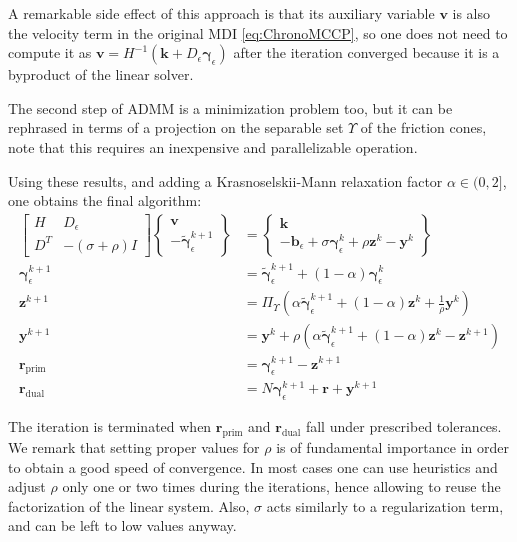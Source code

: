 \documentclass{svproc}
\newcommand{\vect}[1]{\bm{#1}}
\begin{document}
A remarkable side effect of this approach is that its auxiliary variable $\vect{v}$ is also the velocity term in the original MDI 
\eqref{eq:ChronoMCCP}, so one does not need to compute it as $\vect{v}=H^{-1}(\vect{k} + D_\epsilon \vect{\gamma}_\epsilon )$ after the iteration converged because it is a byproduct of the linear solver.

The second step of ADMM is a minimization problem too, but it can be rephrased in terms of a projection on the separable set $\Upsilon$ of the friction cones, note that this requires an inexpensive and parallelizable operation. 

Using these results, and adding a Krasnoselskii-Mann relaxation factor $\alpha \in(0,2]$, one obtains the final algorithm:
%
\begin{subequations}
	\begin{align}
    \begin{bmatrix}
		 H   & D_\epsilon \\
		 D^T & -(\sigma+\rho) I
		\end{bmatrix}
		\begin{Bmatrix}
		 \vect{v}    \\
		 -\tilde{\vect{\gamma}}_\epsilon^{k+1}
		\end{Bmatrix}
		&=
		\begin{Bmatrix}
		 \vect{k} \\
		 -\vect{b}_\epsilon + \sigma \vect{\gamma}_\epsilon^k +\rho \vect{z}^k - \vect{y}^k 
		\end{Bmatrix}
		\\
		\vect{\gamma}^{k+1}_\epsilon &=\tilde{\vect{\gamma}}_\epsilon^{k+1} + (1-\alpha) \vect{\gamma}_\epsilon^k \\
		\vect{z}^{k+1} &= \Pi_\Upsilon \left( \alpha \tilde{\vect{\gamma}}_\epsilon^{k+1} + (1-\alpha) \vect{z}^k  + \frac{1}{\rho} \vect{y}^k \right) \\
		\vect{y}^{k+1} &= \vect{y}^k + \rho \left( \alpha \tilde{\vect{\gamma}}_\epsilon^{k+1} + (1-\alpha) \vect{z}^k - \vect{z}^{k+1} \right) \\
		\vect{r}_{\text{prim}} &= \vect{\gamma}_\epsilon^{k+1}-\vect{z}^{k+1} \\
		\vect{r}_{\text{dual}} &= N \vect{\gamma}_\epsilon^{k+1}+\vect{r}+\vect{y}^{k+1} 
	\end{align}
	\label{eq:admm_final}
\end{subequations}

The iteration is terminated when $\vect{r}_{\text{prim}}$ and $\vect{r}_{\text{dual}}$ fall under prescribed tolerances. We remark that setting proper values for $\rho$ is of fundamental importance in order to obtain a good speed of convergence. In most cases one can use heuristics and adjust $\rho$ only one or two times during the iterations, hence allowing to reuse the factorization of the linear system. Also, $\sigma$ acts similarly to a regularization term, and can be left to low values anyway.
\end{document}
